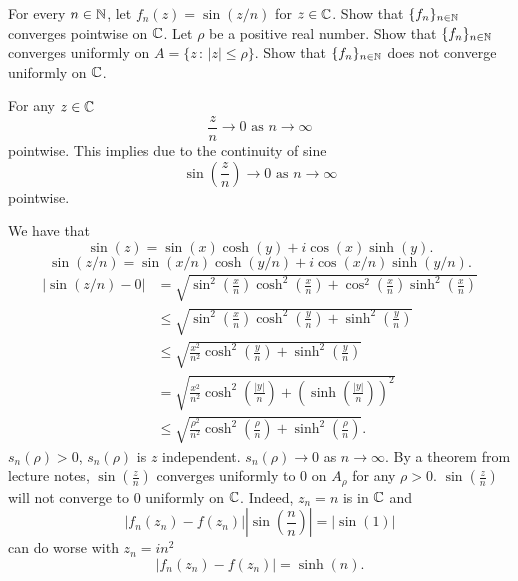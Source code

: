 \documentclass[10pt, a4paper]{article}
\begin{document}
\begin{problem}
    For every $n \in \mathbb{N}$,
    let $f_n(z) = \sin(z / n)$ for $z \in \mathbb{C}$.
    Show that $\{f_n\}_{n \in \mathbb{N}}$ converges pointwise on $\mathbb{C}$.
    Let $\rho$ be a positive real number.
    Show that $\{f_n\}_{n \in \mathbb{N}}$ converges uniformly on $A = \{z\,:\,|z| \leq \rho\}$.
    Show that $\{f_n\}_{n \in \mathbb{N}}$ does not converge uniformly on $\mathbb{C}$.

    \begin{solution}
        For any $z \in \mathbb{C}$
        \[
        \frac{z}{n} \to 0\text{ as } n \to \infty
        \]
        pointwise.
        This implies due to the continuity of sine
        \[
        \sin\left(\frac{z}{n}\right) \to 0\text{ as } n \to \infty
        \]
        pointwise.

        We have that
        \[
        \sin(z) = \sin(x)\cosh(y) + i\cos(x)\sinh(y).
        \]
        \[
        \sin(z / n) = \sin(x / n)\cosh(y / n) + i\cos(x / n)\sinh(y / n).
        \]
        \begin{align*}
            |\sin(z / n) - 0| &= \sqrt{\sin ^ 2\left(\frac{x}{n}\right)\cosh ^ 2\left(\frac{x}{n}\right) + \cos ^ 2\left(\frac{x}{n}\right)\sinh ^ 2\left(\frac{x}{n}\right)} \\
            &\leq \sqrt{\sin ^ 2\left(\frac{x}{n}\right)\cosh ^ 2\left(\frac{y}{n}\right) + \sinh ^ 2\left(\frac{y}{n}\right)} \\
            &\leq \sqrt{\frac{x ^ 2}{n ^ 2}\cosh ^ 2\left(\frac{y}{n}\right) + \sinh ^ 2\left(\frac{y}{n}\right)} \\
            &= \sqrt{\frac{x ^ 2}{n ^ 2}\cosh ^ 2\left(\frac{|y|}{n}\right) + \left(\sinh\left(\frac{|y|}{n}\right)\right) ^ 2} \\
            &\leq \sqrt{\frac{\rho ^ 2}{n ^ 2}\cosh ^ 2\left(\frac{\rho}{n}\right) + \sinh ^ 2\left(\frac{\rho}{n}\right)}.
        \end{align*}
        $s_n(\rho) > 0$,
        $s_n(\rho)$ is $z$ independent.
        $s_n(\rho) \to 0$ as $n \to \infty$.
        By a theorem from lecture notes,
        $\sin\left(\frac{z}{n}\right)$ converges uniformly to $0$ on $A_{\rho}$ for any $\rho > 0$.
        $\sin\left(\frac{z}{n}\right)$ will not converge to $0$ uniformly on $\mathbb{C}$.
        Indeed,
        $z_n = n$ is in $\mathbb{C}$ and
        \[
        |f_n(z_n) - f(z_n)|\left|\sin\left(\frac{n}{n}\right)\right| = |\sin(1)|
        \]
        can do worse with $z_n = in ^ 2$
        \[
        |f_n(z_n) - f(z_n)| = \sinh(n).
        \]
    \end{solution}
\end{problem}
\end{document}
